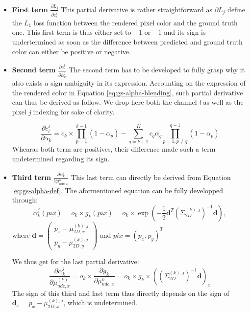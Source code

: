 \begin{itemize}
    
    \item \textbf{First term} $\frac{\partial L_{j}}{\partial c_{l}^{j}}$ 
This partial derivative is rather straightforward as $\partial L_{j}$ define the $L_{1}$ loss function between the rendered pixel color and the ground truth one. This first term is thus either set to $+1$ or $-1$ and its sign is undertermined as soon as the difference between predicted and ground truth color can either be positive or negative. 

    \item \textbf{Second term} $\frac{\partial c_{l}^{j}}{\partial \alpha_{k}^{j}}$ 
The second term has to be developed to fully grasp why it also exists a sign ambiguity in its expression. Accounting on the expression of the rendered color in Equation \eqref{eq:gs-alpha-blending}, such partial derivative can thus be derived as follow. We drop here both the channel  \textit{l} as well as the pixel \textit{j} indexing for sake of clarity.  

\begin{equation}
    \frac{\partial c_{l}^{j}}{\partial \alpha_{k}} = c_{k} \times \prod \limits_{p=1}^{k-1}(1 - \alpha_{p}) - \sum \limits_{q=k+1}^{K} c_{q}\alpha_{q}\prod \limits_{p=1,p\neq q}^{q-1}(1 - \alpha_{p})
\end{equation}
Whearas both term are positives, their difference made such a term undetermined regarding its sign. 

    \item \textbf{Third term} $\frac{\partial \alpha_{k}^{j}}{\partial \mu^{k}_{ndc,x}}$ 
This last term can directly be derived from Equation \eqref{eq:gs-alpha-def}. The aformentioned equation can be fully developped through: 
\begin{equation}
    \alpha_{k}^j(pix) =o_{k} \times g_{k}(pix) =  o_{k} \times \exp \left( -\frac{1}{2} \mathbf{d}^T \left( \Sigma_{2D}^{(k),j} \right)^{-1} \mathbf{d} \right),  
\end{equation}
where $\mathbf{d} = \begin{pmatrix}
    p_x - \mu_{2D,x}^{(k),j} \\
    p_y - \mu_{2D,y}^{(k),j}
\end{pmatrix}$ and $pix=\left( p_{x},p_{y}\right)^{T}$ 

We thus get for the last partial derivative: 
\begin{equation}
    \frac{\partial \alpha_{k}^{j}}{\partial \mu^{(k)}_{ndc,x}} =  o_{k} \times \frac{\partial g_{k}}{\partial \mu^{k}_{ndc,x}} = o_{k} \times g_{k} \times ((\Sigma_{2D}^{(k),j})^{-1}\mathbf{d})_{x}
\end{equation}
The sign of this third and last term thus directly depends on the sign of $\mathbf{d}_{x} = p_x - \mu_{2D,x}^{(k),j}$, which is undetermined. 

\end{itemize}






